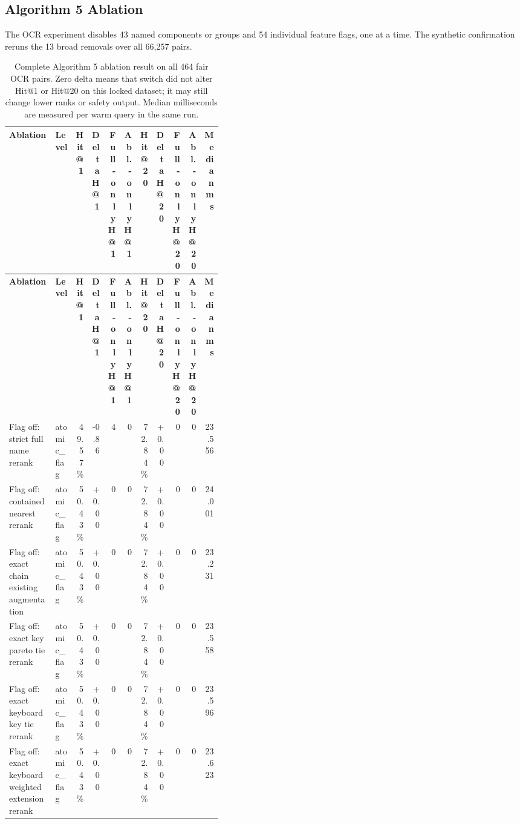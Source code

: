 \begin{landscape}
\subsection{Algorithm 5 Ablation}
The OCR experiment disables 43 named components or groups and 54 individual feature flags, one at a time. The synthetic confirmation reruns the 13 broad removals over all 66,257 pairs.

\begin{tiny}
\setlength{\tabcolsep}{1pt}
\renewcommand{\arraystretch}{1.05}
\begin{longtable}{@{}L{0.30\linewidth}L{0.11\linewidth}rrrrrrrrr@{}}
\caption{Complete Algorithm 5 ablation result on all 464 fair OCR pairs. Zero delta means that switch did not alter Hit@1 or Hit@20 on this locked dataset; it may still change lower ranks or safety output. Median milliseconds are measured per warm query in the same run.}\label{tab:expanded-a5-ocr-ablations}\\
\toprule
\textbf{Ablation} & \textbf{Level} & \textbf{Hit@1} & \textbf{Delta H@1} & \textbf{Full-only H@1} & \textbf{Abl.-only H@1} & \textbf{Hit@20} & \textbf{Delta H@20} & \textbf{Full-only H@20} & \textbf{Abl.-only H@20} & \textbf{Median ms} \\
\midrule
\endfirsthead
\toprule
\textbf{Ablation} & \textbf{Level} & \textbf{Hit@1} & \textbf{Delta H@1} & \textbf{Full-only H@1} & \textbf{Abl.-only H@1} & \textbf{Hit@20} & \textbf{Delta H@20} & \textbf{Full-only H@20} & \textbf{Abl.-only H@20} & \textbf{Median ms} \\
\midrule
\endhead
Flag off: strict full name rerank & atomic\_flag & 49.57\% & -0.86 & 4 & 0 & 72.84\% & +0.00 & 0 & 0 & 23.556 \\
Flag off: contained nearest rerank & atomic\_flag & 50.43\% & +0.00 & 0 & 0 & 72.84\% & +0.00 & 0 & 0 & 24.001 \\
Flag off: exact chain existing augmentation & atomic\_flag & 50.43\% & +0.00 & 0 & 0 & 72.84\% & +0.00 & 0 & 0 & 23.231 \\
Flag off: exact key pareto tie rerank & atomic\_flag & 50.43\% & +0.00 & 0 & 0 & 72.84\% & +0.00 & 0 & 0 & 23.558 \\
Flag off: exact keyboard key tie rerank & atomic\_flag & 50.43\% & +0.00 & 0 & 0 & 72.84\% & +0.00 & 0 & 0 & 23.596 \\
Flag off: exact keyboard weighted extension rerank & atomic\_flag & 50.43\% & +0.00 & 0 & 0 & 72.84\% & +0.00 & 0 & 0 & 23.623 \\

\end{longtable}
\end{tiny}
\end{landscape}
